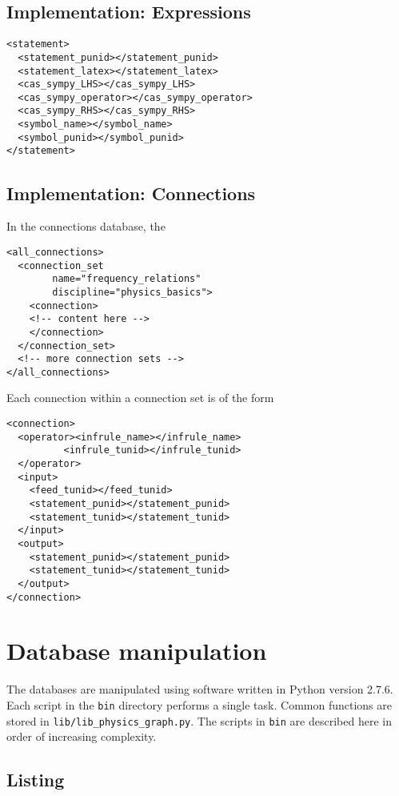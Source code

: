 \documentclass{article}
\begin{document}
\begin{multicols}{2}
\subsection{Implementation: Expressions\label{sec:expressions}}

\begin{verbatim}
<statement>
  <statement_punid></statement_punid>
  <statement_latex></statement_latex>
  <cas_sympy_LHS></cas_sympy_LHS>
  <cas_sympy_operator></cas_sympy_operator>
  <cas_sympy_RHS></cas_sympy_RHS>
  <symbol_name></symbol_name>
  <symbol_punid></symbol_punid>
</statement>
\end{verbatim}

\subsection{Implementation: Connections\label{sec:connections}}

In the connections database, the 
\begin{verbatim}
<all_connections>
  <connection_set 
        name="frequency_relations" 
        discipline="physics_basics">
    <connection>
    <!-- content here -->
    </connection>
  </connection_set>
  <!-- more connection sets -->
</all_connections>
\end{verbatim}

Each connection within a connection set is of the form

\begin{verbatim}
<connection>
  <operator><infrule_name></infrule_name>
          <infrule_tunid></infrule_tunid>
  </operator>
  <input>
    <feed_tunid></feed_tunid>
    <statement_punid></statement_punid>
    <statement_tunid></statement_tunid>
  </input>
  <output>
    <statement_punid></statement_punid>
    <statement_tunid></statement_tunid>
  </output>
</connection>
\end{verbatim}


\section{Database manipulation}

The databases are manipulated using software written in Python\cite{2015_Python} version 2.7.6. 
Each script in the \texttt{bin} directory performs a single task.
Common functions are stored in \texttt{lib/lib\_physics\_graph.py}. 
The scripts in \texttt{bin} are described here in order of increasing complexity.

\subsection{Listing}


\end{multicols}
\end{document}
